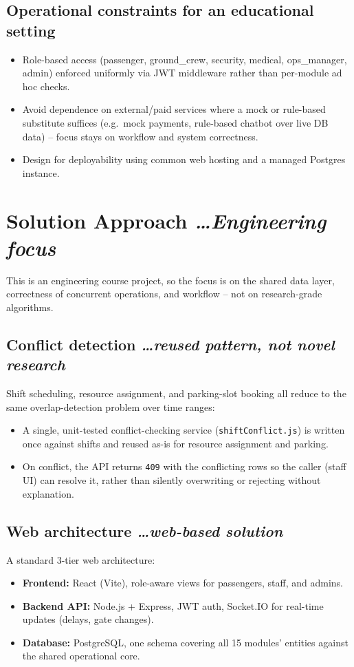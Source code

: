 \documentclass[11pt,a4paper]{article}
\newcommand{\BvrHint}[1]{%
  {\normalfont\normalsize\itshape\hfill #1}}
\begin{document}
\subsection{Operational constraints for an educational setting}
\begin{itemize}[leftmargin=0.7cm]
    \item Role-based access (passenger, ground\_crew, security,
      medical, ops\_manager, admin) enforced uniformly via JWT
      middleware rather than per-module ad hoc checks.
    \item Avoid dependence on external/paid services where a mock or
      rule-based substitute suffices (e.g.\ mock payments, rule-based
      chatbot over live DB data) -- focus stays on workflow and system
      correctness.
    \item Design for deployability using common web hosting and a
      managed Postgres instance.
\end{itemize}

\section{Solution Approach %
\BvrHint{\ldots Engineering focus}}
This is an engineering course project, so the focus is on the shared
data layer, correctness of concurrent operations, and workflow --
not on research-grade algorithms.

\subsection{Conflict detection %
\BvrHint{\ldots reused pattern, not novel research}}
Shift scheduling, resource assignment, and parking-slot booking all
reduce to the same overlap-detection problem over time ranges:
\begin{itemize}[leftmargin=0.7cm]
    \item A single, unit-tested conflict-checking service
      (\texttt{shiftConflict.js}) is written once against shifts and
      reused as-is for resource assignment and parking.
    \item On conflict, the API returns \texttt{409} with the
      conflicting rows so the caller (staff UI) can resolve it, rather
      than silently overwriting or rejecting without explanation.
\end{itemize}

\subsection{Web architecture %
\BvrHint{\ldots web-based solution}}
A standard 3-tier web architecture:
\begin{itemize}[leftmargin=0.7cm]
    \item \textbf{Frontend:} React (Vite), role-aware views for
      passengers, staff, and admins.
    \item \textbf{Backend API:} Node.js + Express, JWT auth,
      Socket.IO for real-time updates (delays, gate changes).
    \item \textbf{Database:} PostgreSQL, one schema covering all
      15 modules' entities against the shared operational core.
\end{itemize}
\end{document}
